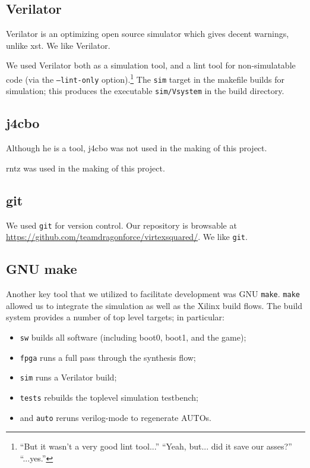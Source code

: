 \documentclass[10pt]{report}
\begin{document}
\subsection{Verilator}

Verilator is an optimizing open source simulator which gives decent
warnings, unlike xst. We like Verilator.

We used Verilator both as a simulation tool, and a lint tool for
non-simulatable code (via the \texttt{--lint-only} option).\footnote{``But
it wasn't a very good lint tool...'' ``Yeah, but...  did it save our
asses?'' ``...yes.''} The \texttt{sim} target in the makefile builds for
simulation; this produces the executable \texttt{sim/Vsystem} in the build
directory.

\subsection{j4cbo}

Although he is a tool, j4cbo was not used in the making of this project.

rntz was used in the making of this project.

\subsection{git}

We used \texttt{git} for version control. Our repository is browsable at
\url{https://github.com/teamdragonforce/virtexsquared/}. We like \texttt{git}.

\subsection{GNU make}

\label{sec:build}

Another key tool that we utilized to facilitate development was GNU
\texttt{make}.  \texttt{make} allowed us to integrate the simulation as well
as the Xilinx build flows.  The build system provides a number of top level
targets; in particular:

\begin{itemize}
\item{\texttt{sw} builds all software (including boot0, boot1, and the game);}
\item{\texttt{fpga} runs a full pass through the synthesis flow;}
\item{\texttt{sim} runs a Verilator build;}
\item{\texttt{tests} rebuilds the toplevel simulation testbench;}
\item{and \texttt{auto} reruns verilog-mode to regenerate AUTOs.}
\end{itemize}
\end{document}
